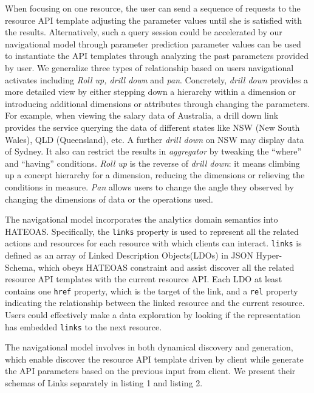 \documentclass[10pt, conference, compsocconf]{IEEEtran}
\begin{document}
When focusing on one resource, the user can send a sequence of requests to the resource API template adjusting the parameter values until she is satisfied with the results. Alternatively, such a query session could be accelerated by our navigational model through parameter prediction  \textemdash  parameter values can be used to instantiate the API templates through analyzing the past parameters provided by user. We generalize three types of relationship based on users navigational activates including \textit{Roll up, drill down }and \textit{pan}. Concretely, \textit{drill down} provides a more detailed view by either stepping down a hierarchy within a dimension or introducing additional dimensions or attributes through changing the parameters. For example, when viewing the salary data of Australia, a drill down link provides the service querying the data of different states like NSW (New South Wales), QLD (Queensland), etc. A further \textit{drill down} on NSW may display data of Sydney. It also can restrict the results in \textit{aggregator} by tweaking the “where” and “having” conditions. \textit{Roll up} is the reverse of \textit{drill down}: it means climbing up a concept hierarchy for a dimension, reducing the dimensions or relieving the conditions in measure. \textit{Pan} allows users to change the angle they observed by changing the dimensions of data or the operations used.

The navigational model incorporates the analytics domain semantics into HATEOAS. Specifically, the \texttt{links} property is used to represent all the related actions and resources for each resource with which clients can interact. \texttt{links} is defined as an array of Linked Description Objects(LDOs) in JSON Hyper-Schema\cite{JSONSchema}, which obeys HATEOAS constraint and assist discover all the related resource API templates with the current resource API.  Each LDO at least contains one \texttt{href} property, which is the target of the link, and a \texttt{rel} property indicating the relationship between the linked resource and the current resource. Users could effectively make a data exploration by looking if the representation has embedded \texttt{links} to the next resource. 

The navigational model involves in both dynamical discovery and generation, which enable discover the resource API template driven by client while generate the API parameters based on the previous input from client. We present their schemas of Links separately in listing 1 and listing 2. 
\end{document}
